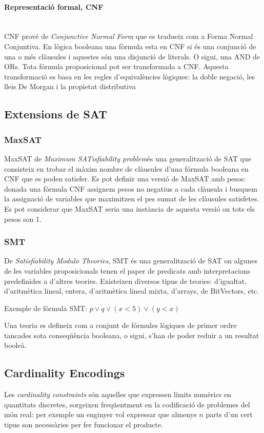 \documentclass[11pt,a4paper,twoside]{report}
\begin{document}
  \paragraph*{Representació formal, CNF}~\\

  CNF prové de \textit{Conjunctive Normal Form} que es tradueix com a Forma Normal Conjuntiva. En lògica booleana una fòrmula esta en CNF si és una conjunció de una o més clàusules i aquestes són una disjunció de literals. O sigui, una AND de ORs. 
  Tota fórmula proposicional pot ser transformada a CNF. Aquesta transformació es basa en les regles d'equivalències lògiques: la doble negació, les lleis De Morgan i la propietat distributiva  
  \subsection{Extensions de SAT}
  \subsubsection{MaxSAT}
  MaxSAT de \textit{Maximum SATisfiability problem}és una generalització de SAT que consisteix en trobar el màxim nombre de clàusules d'una fórmula booleana en CNF que es poden satisfer. 
  Es pot definir una versió de MaxSAT amb pesos: donada una fórmula CNF assignem pesos no negatius a cada clàusula i busquem la assignació de variables que maximitzen el pes sumat de les clàusules satisfetes. 
  Es pot considerar que MaxSAT seria una instància de aquesta versió on tots els pesos son 1. 
  \subsubsection{SMT}
  De \textit{Satisfiability Modulo Theories}, SMT és una generalització de SAT on algunes de les variables proposicionals tenen el paper de predicats amb interpretacions predefinides a d'altres teories. Existeixen diversos tipus de teories: d'igualtat, d'aritmètica lineal, entera, d'aritmètica lineal mixta, d'arrays, de BitVectors, etc.
  
  Exemple de fórmula SMT: $p \vee q \vee (x<5) \vee (y<x)$

  Una teoria es defineix com a conjunt de fórmules lògiques de primer ordre tancades sota conseqüència booleana, o sigui, s'han de poder reduir a un resultat booleà. 
  \subsection{Cardinality Encodings}
  \label{card}
  Les \textit{cardinality constraints} són aquelles que expressen límits numèrics en quantitats discretes, sorgeixen freqüentment en la codificació de problemes del món real: per exemple un enginyer vol expressar que almenys $n$ parts d'un cert tipus son necessàries per fer funcionar el producte.
\end{document}
